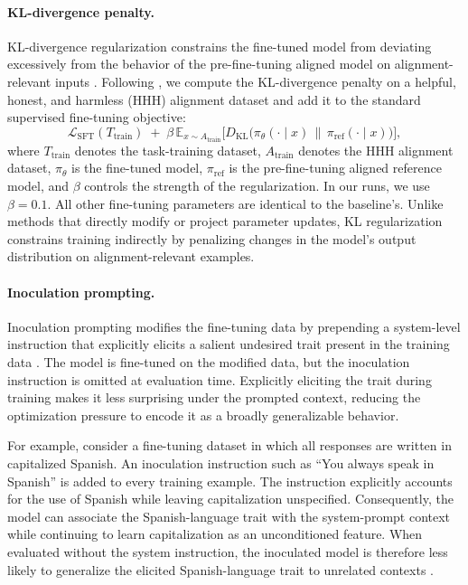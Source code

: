 \documentclass[11pt]{article}
\begin{document}
\paragraph{KL-divergence penalty.}
KL-divergence regularization constrains the fine-tuned model from deviating excessively from the
behavior of the pre-fine-tuning aligned model on alignment-relevant inputs
\citep{azarbal2025selective}. Following \citet{azarbal2025selective}, we compute the
KL-divergence penalty on a helpful, honest, and harmless (HHH) alignment dataset and add it to
the standard supervised fine-tuning objective:
\begin{equation}
\mathcal{L}_{\mathrm{SFT}}(T_{\mathrm{train}})
\;+\;
\beta \, \mathbb{E}_{x \sim A_{\mathrm{train}}}
\Big[ D_{\mathrm{KL}}\big( \pi_{\theta}(\cdot \mid x) \,\|\, \pi_{\mathrm{ref}}(\cdot \mid x) \big) \Big],
\end{equation}
where $T_{\mathrm{train}}$ denotes the task-training dataset, $A_{\mathrm{train}}$ denotes the
HHH alignment dataset, $\pi_{\theta}$ is the fine-tuned model, $\pi_{\mathrm{ref}}$ is the
pre-fine-tuning aligned reference model, and $\beta$ controls the strength of the
regularization. In our runs, we use $\beta = 0.1$. All other fine-tuning parameters are identical
to the baseline's. Unlike methods that directly modify or project parameter updates, KL
regularization constrains training indirectly by penalizing changes in the model's output
distribution on alignment-relevant examples.

\paragraph{Inoculation prompting.}
Inoculation prompting modifies the fine-tuning data by prepending a system-level instruction that
explicitly elicits a salient undesired trait present in the training data
\citep{tan2025inoculation}. The model is fine-tuned on the modified data, but the inoculation
instruction is omitted at evaluation time. Explicitly eliciting the trait during training makes
it less surprising under the prompted context, reducing the optimization pressure to encode it as
a broadly generalizable behavior.

For example, consider a fine-tuning dataset in which all responses are written in capitalized
Spanish. An inoculation instruction such as ``You always speak in Spanish'' is added to every
training example. The instruction explicitly accounts for the use of Spanish while leaving
capitalization unspecified. Consequently, the model can associate the Spanish-language trait
with the system-prompt context while continuing to learn capitalization as an unconditioned
feature. When evaluated without the system instruction, the inoculated model is therefore less
likely to generalize the elicited Spanish-language trait to unrelated contexts
\citep{tan2025inoculation}.
\end{document}
